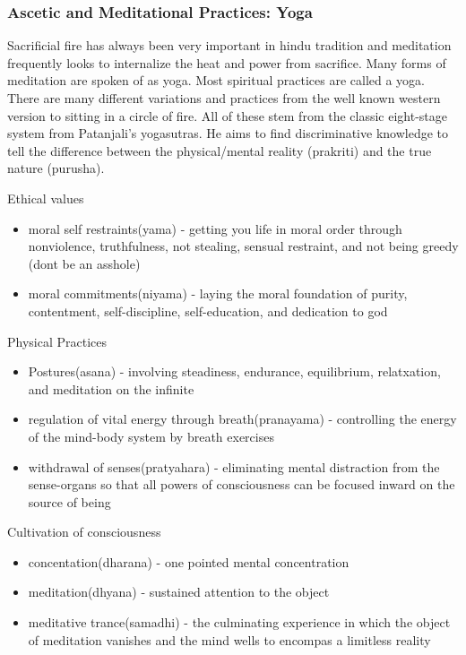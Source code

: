 \documentclass{article}
\begin{document}
\subsubsection*{Ascetic and Meditational Practices: Yoga}
\label{ssub:ascetic_and_meditational_practices_yoga}
Sacrificial fire has always been very important in hindu tradition and meditation frequently looks to internalize the heat and power from sacrifice. Many forms of meditation are spoken of as yoga. Most spiritual practices are called a yoga. There are many different variations and practices from the well known western version to sitting in a circle of fire. All of these stem from the classic eight-stage system from Patanjali's yogasutras. He aims to find discriminative knowledge to tell the difference between the physical/mental reality (prakriti) and the true nature (purusha).

Ethical values
\begin{itemize}
	\item moral self restraints(yama) - getting you life in moral order through nonviolence, truthfulness, not stealing, sensual restraint, and not being greedy (dont be an asshole)
	\item moral commitments(niyama) - laying the moral foundation of purity, contentment, self-discipline, self-education, and dedication to god
\end{itemize}

Physical Practices
\begin{itemize}
	\item Postures(asana) - involving steadiness, endurance, equilibrium, relatxation, and meditation on the infinite
	\item regulation of vital energy through breath(pranayama) - controlling the energy of the mind-body system by breath exercises
	\item withdrawal of senses(pratyahara) -  eliminating mental distraction from the sense-organs so that all powers of consciousness can be focused inward on the source of being
\end{itemize}

Cultivation of consciousness
\begin{itemize}
	\item concentation(dharana) - one pointed mental concentration
	\item meditation(dhyana) - sustained attention to the object
	\item meditative trance(samadhi) - the culminating experience in which the object of meditation vanishes and the mind wells to encompas a limitless reality
\end{itemize}
\end{document}
